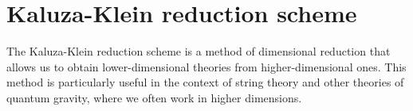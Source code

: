 
\chapter{Kaluza-Klein reduction scheme} %

\label{AppendixA} %


The Kaluza-Klein reduction scheme is a method of dimensional reduction that allows us to obtain lower-dimensional theories from higher-dimensional ones. This method is particularly useful in the context of string theory and other theories of quantum gravity, where we often work in higher dimensions.



